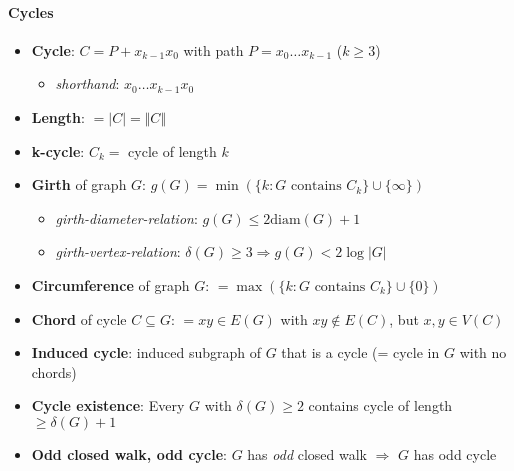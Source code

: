 \paragraph{Cycles}
\begin{itemize}
  \item \textbf{Cycle}: $ C = P + x_{k-1}x_0 $ with path $ P = x_0\dots x_{k-1} $ ($ k \geq 3 $)
  \begin{itemize}
    \item \emph{shorthand}: $ x_0\dots x_{k-1}x_0 $ 
  \end{itemize}
  \item \textbf{Length}: $ = \vert C \vert = \Vert C \Vert $
  \item \textbf{k-cycle}: $ C_k = $ cycle of length $ k $
  \item \textbf{Girth} of graph $ G $: $ g(G) = \min\left( \{ k : G \text{ contains } C_k \} \cup \{ \infty \} \right) $
  \begin{itemize}
    \item \emph{girth-diameter-relation}: $ g(G) \leq 2\text{diam}(G)+1 $ 
    \item \emph{girth-vertex-relation}: $ \delta(G) \geq 3 \Rightarrow g(G) < 2\log \vert G \vert $
  \end{itemize}
  \item \textbf{Circumference} of graph $ G $: $ = \max\left( \{ k : G \text{ contains } C_k \} \cup \{ 0 \} \right) $
  \item \textbf{Chord} of cycle $ C \subseteq G $: $ = xy \in E(G) $ with $ xy \not \in E(C) $, but $ x,y \in V(C) $
  \item \textbf{Induced cycle}: induced subgraph of $ G $ that is a cycle (= cycle in $ G $ with no chords)
  \item \textbf{Cycle existence}: Every $ G $ with $ \delta(G) \geq 2 $ contains cycle of length $ \geq \delta(G) + 1 $
  \item \textbf{Odd closed walk, odd cycle}: $ G $  has \emph{odd} closed walk $ \Rightarrow $ $ G $ has odd cycle
\end{itemize}


